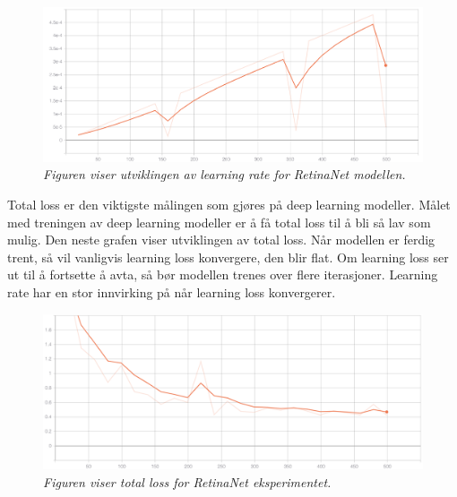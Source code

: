 \begin{figure}[H]
\begin{center} 
\includegraphics[scale=0.35]{figures/lr_retinanet_5}
\caption{\small \sl Figuren viser utviklingen av learning rate for RetinaNet modellen. \label{fig:lr_retinanet}}
\end{center}
\end{figure}



Total loss er den viktigste målingen som gjøres på deep learning modeller. Målet med treningen av deep learning modeller er å få total loss til å bli så lav som mulig. Den neste grafen viser utviklingen av total loss. Når modellen er ferdig trent, så vil vanligvis learning loss konvergere, den blir flat. Om learning loss ser ut til å fortsette å avta, så bør modellen trenes over flere iterasjoner. Learning rate har en stor innvirking på når learning loss konvergerer.

\begin{figure}[H]
\begin{center} 
\includegraphics[scale=0.35]{figures/total_loss_retinanet_8}
\caption{\small \sl Figuren viser total loss for RetinaNet eksperimentet. \label{fig:total_loss_retinanet}}
\end{center}
\end{figure}

